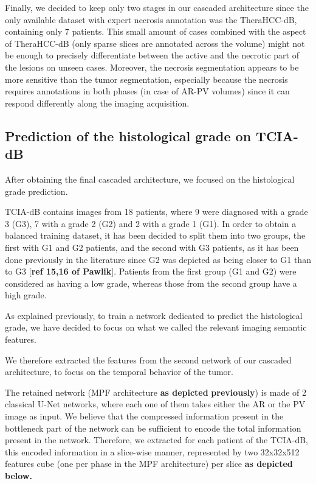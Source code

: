 \documentclass[]{article}
\begin{document}
Finally, we decided to keep only two stages in our cascaded architecture
since the only available dataset with expert necrosis annotation was the
TheraHCC-dB, containing only 7 patients. This small amount of cases
combined with the aspect of TheraHCC-dB (only sparse slices are
annotated across the volume) might not be enough to precisely
differentiate between the active and the necrotic part of the lesions on
unseen cases. Moreover, the necrosis segmentation appears to be more
sensitive than the tumor segmentation, especially because the necrosis
requires annotations in both phases (in case of AR-PV volumes) since it
can respond differently along the imaging acquisition.

\subsection{Prediction of the histological grade on
TCIA-dB}\label{prediction-of-the-histological-grade-on-tcia-db}

After obtaining the final cascaded architecture, we focused on the
histological grade prediction.

TCIA-dB contains images from 18 patients, where 9 were diagnosed with a
grade 3 (G3), 7 with a grade 2 (G2) and 2 with a grade 1 (G1). In order
to obtain a balanced training dataset, it has been decided to split them
into two groups, the first with G1 and G2 patients, and the second with
G3 patients, as it has been done previously in the literature since G2
was depicted as being closer to G1 than to G3 {[}\textbf{ref 15,16 of
Pawlik}{]}. Patients from the first group (G1 and G2) were considered as
having a low grade, whereas those from the second group have a high
grade.

As explained previously, to train a network dedicated to predict the
histological grade, we have decided to focus on what we called the
relevant imaging semantic features.

We therefore extracted the features from the second network of our
cascaded architecture, to focus on the temporal behavior of the tumor.

The retained network (MPF architecture \textbf{as depicted}
\textbf{previously}) is made of 2 classical U-Net networks, where each
one of them takes either the AR or the PV image as input. We believe
that the compressed information present in the bottleneck part of the
network can be sufficient to encode the total information present in the
network. Therefore, we extracted for each patient of the TCIA-dB, this
encoded information in a slice-wise manner, represented by two 32x32x512
features cube (one per phase in the MPF architecture) per slice
\textbf{as depicted below.}
\end{document}
